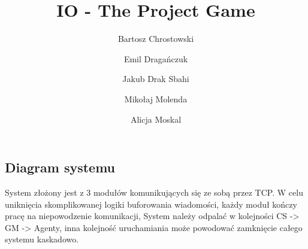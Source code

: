 \documentclass[a4paper]{article}
\title{IO - The Project Game}
\author{Bartosz Chrostowski
        \and Emil Dragańczuk
        \and Jakub Drak Sbahi
        \and Mikołaj Molenda
        \and Alicja Moskal}
\date{}
\begin{document}
\maketitle
\newpage
\tableofcontents
\newpage

\newpage


\begin{samepage}
        \newpage
        \section{Diagram systemu}
        System złożony jest z 3 modułów komunikujących się ze sobą przez TCP.
        W celu uniknięcia skomplikowanej logiki buforowania wiadomości, każdy moduł kończy pracę na niepowodzenie komunikacji,
        System należy odpalać w kolejności CS -> GM -> Agenty, inna kolejność uruchamiania może powodować zamknięcie całego systemu kaskadowo.
\end{samepage}









\end{document}
